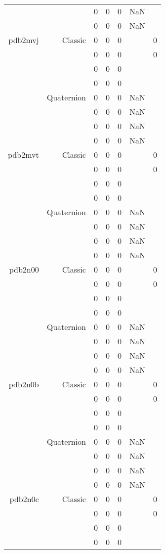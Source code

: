 \begin{xltabular}{\textwidth}{r|rcccSc}
& & 0 & 0 & 0 & NaN & \\
& & 0 & 0 & 0 & NaN & \\ \addlinespace
pdb2mvj & Classic & 0 & 0 & 0 & & 0 \\
& & 0 & 0 & 0 & & 0 \\
& & 0 & 0 & 0 & & \\
& & 0 & 0 & 0 & & \\
& Quaternion & 0 & 0 & 0 & NaN & \\
& & 0 & 0 & 0 & NaN & \\
& & 0 & 0 & 0 & NaN & \\
& & 0 & 0 & 0 & NaN & \\ \addlinespace
pdb2mvt & Classic & 0 & 0 & 0 & & 0 \\
& & 0 & 0 & 0 & & 0 \\
& & 0 & 0 & 0 & & \\
& & 0 & 0 & 0 & & \\
& Quaternion & 0 & 0 & 0 & NaN & \\
& & 0 & 0 & 0 & NaN & \\
& & 0 & 0 & 0 & NaN & \\
& & 0 & 0 & 0 & NaN & \\ \addlinespace
pdb2n00 & Classic & 0 & 0 & 0 & & 0 \\
& & 0 & 0 & 0 & & 0 \\
& & 0 & 0 & 0 & & \\
& & 0 & 0 & 0 & & \\
& Quaternion & 0 & 0 & 0 & NaN & \\
& & 0 & 0 & 0 & NaN & \\
& & 0 & 0 & 0 & NaN & \\
& & 0 & 0 & 0 & NaN & \\ \addlinespace
pdb2n0b & Classic & 0 & 0 & 0 & & 0 \\
& & 0 & 0 & 0 & & 0 \\
& & 0 & 0 & 0 & & \\
& & 0 & 0 & 0 & & \\
& Quaternion & 0 & 0 & 0 & NaN & \\
& & 0 & 0 & 0 & NaN & \\
& & 0 & 0 & 0 & NaN & \\
& & 0 & 0 & 0 & NaN & \\ \addlinespace
pdb2n0c & Classic & 0 & 0 & 0 & & 0 \\
& & 0 & 0 & 0 & & 0 \\
& & 0 & 0 & 0 & & \\
& & 0 & 0 & 0 & & \\

\end{xltabular}
